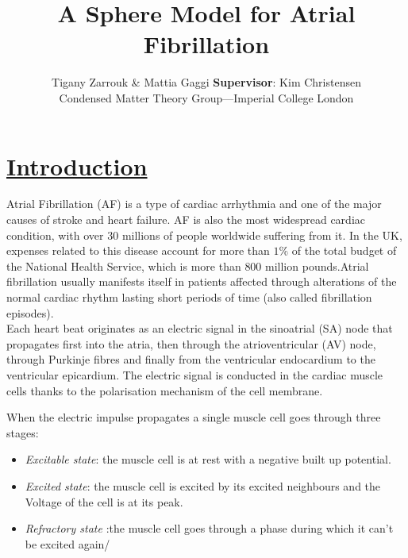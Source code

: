 \documentclass[twocolumn, a1paper, 20pt]{article}
\begin{document}
\title {\textbf{ A Sphere Model for Atrial Fibrillation}}
\author{Tigany Zarrouk \& Mattia Gaggi \textbf{Supervisor}: Kim Christensen \\ Condensed Matter Theory Group---Imperial College London}

\date{}
\maketitle






\section{\textbf{\underline{Introduction}}}

Atrial Fibrillation (AF) is a type of cardiac arrhythmia and one of the major causes of stroke and heart failure. AF is also the most widespread cardiac condition, with over 30 millions of people worldwide suffering from it. In the UK, expenses related to this disease account for more than $1\%$ of the total budget of the National Health Service, which is more than $800$ million pounds.Atrial fibrillation usually manifests itself in patients affected through alterations of the normal cardiac rhythm lasting short periods of time (also called fibrillation episodes).\\

Each heart beat originates as an electric signal in the sinoatrial (SA) node that propagates first into the atria, then through the atrioventricular (AV) node, through Purkinje fibres and finally from the ventricular endocardium to the ventricular epicardium. The electric signal is conducted in the cardiac muscle cells thanks to the polarisation mechanism of the cell membrane. 






When the electric impulse propagates a single muscle cell goes through three stages:

\begin{itemize}
  \item \textit{Excitable state}: the muscle cell is at rest with a negative built up potential.
  										
  \item \textit{Excited state}: the muscle cell is excited by its excited neighbours and the Voltage of the cell is at its peak. 
  \item \textit{Refractory state} :the muscle cell goes through a phase during which it can't be excited again/
\end{itemize}  
\end{document}
